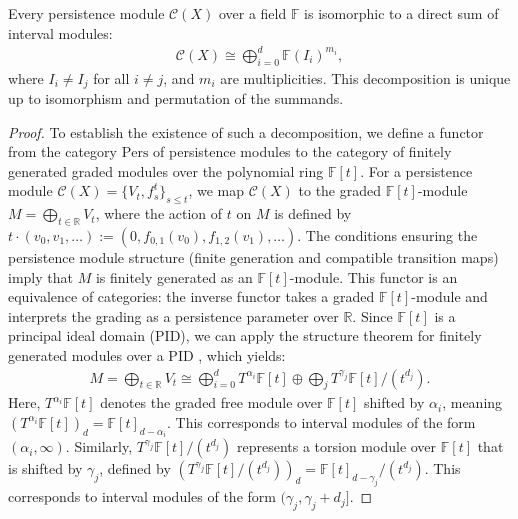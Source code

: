 \begin{theorem}[Decomposition]{\cite[\S 1.5]{chazal2016structure}}
\label{decompositionPersistenceModules}
Every persistence module $\mathcal{C}(X)$ over a field $\mathbb{F}$ is isomorphic to a direct sum of interval modules:
\begin{align}
	\mathcal{C}(X) \cong \bigoplus_{i=0}^{d} \mathbb{F}(I_i)^{m_i},
\end{align}
where $I_i \neq I_j$ for all $i \neq j$, and $m_i$ are multiplicities. This decomposition is unique up to isomorphism and permutation of the summands.
\end{theorem}

\begin{proof}
To establish the existence of such a decomposition, we define a functor from the category $\mathrm{Pers}$ of persistence modules to the category of finitely generated graded modules over the polynomial ring $\mathbb{F}[t]$. For a persistence module $\mathcal{C}(X) = \{V_t, f_{s}^t\}_{s \leq t}$, we map $\mathcal{C}(X)$ to the graded $\mathbb{F}[t]$-module $M = \bigoplus_{t \in \mathbb{R}} V_t$, where the action of $t$ on $M$ is defined by $t \cdot (v_0, v_1, \ldots) := (0, f_{0,1}(v_0), f_{1,2}(v_1), \ldots)$. The conditions ensuring the persistence module structure (finite generation and compatible transition maps) imply that $M$ is finitely generated as an $\mathbb{F}[t]$-module. This functor is an equivalence of categories: the inverse functor takes a graded $\mathbb{F}[t]$-module and interprets the grading as a persistence parameter over $\mathbb{R}$. Since $\mathbb{F}[t]$ is a principal ideal domain (PID), we can apply the structure theorem for finitely generated modules over a PID \cite[\S 2.1]{zomorodian2004computing}, which yields:
\begin{align}
	M = \bigoplus_{t \in \mathbb{R}} V_t \cong \bigoplus_{i=0}^d T^{\alpha_i} \mathbb{F}[t] \oplus \bigoplus_j T^{\gamma_j} \mathbb{F}[t] / (t^{d_j}).
\end{align}
Here, \( T^{\alpha_i} \mathbb{F}[t] \) denotes the graded free module over \( \mathbb{F}[t] \) shifted by \( \alpha_i \), meaning \( (T^{\alpha_i} \mathbb{F}[t])_d = \mathbb{F}[t]_{d - \alpha_i} \). This corresponds to interval modules of the form \( (\alpha_i, \infty) \). Similarly, \( T^{\gamma_j} \mathbb{F}[t] / (t^{d_j}) \) represents a torsion module over \( \mathbb{F}[t] \) that is shifted by \( \gamma_j \), defined by \( (T^{\gamma_j} \mathbb{F}[t] / (t^{d_j}))_d = \mathbb{F}[t]_{d - \gamma_j} / (t^{d_j}) \). This corresponds to interval modules of the form \( (\gamma_j, \gamma_j + d_j] \). 


\end{proof}
